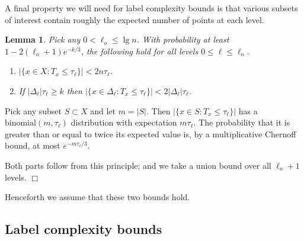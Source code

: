 \documentclass{article}
\newtheorem{lemma}[thm]{Lemma}
\newenvironment{proof}{\noindent {\sc Proof:}}{$\Box$ \medskip}
\begin{document}
A final property we will need for label complexity bounds is that various subsets of interest contain roughly the expected number of points at each level.
\begin{lemma}
Pick any $0 < \ell_o \leq \lg n$. With probability at least $1-2(\ell_o+1)e^{-k/3}$, the following hold for all levels $0 \leq \ell \leq \ell_o$.
\begin{enumerate}
\item[(a)] $|\{x \in X: T_x \leq \tau_\ell\}| < 2 n \tau_\ell$.
\item[(b)] If $|\Delta_\ell| \tau_\ell \geq k$ then $|\{x \in \Delta_{\ell}: T_x \leq \tau_\ell\}| < 2 |\Delta_\ell| \tau_\ell$.
\end{enumerate}
\label{lemma:level-distribution}
\end{lemma}
\begin{proof} 
Pick any subset $S \subset X$ and let $m = |S|$. Then $|\{x \in S: T_x \leq \tau_\ell\}|$ has a $\mbox{binomial}(m, \tau_\ell)$ distribution with expectation $m \tau_\ell$. The probability that it is greater than or equal to twice its expected value is, by a multiplicative Chernoff bound, at most $e^{-m \tau_{\ell}/3}$.

Both parts follow from this principle; and we take a union bound over all $\ell_o + 1$ levels.
\end{proof}

Henceforth we assume that these two bounds hold.

\subsection{Label complexity bounds} 
\end{document}
